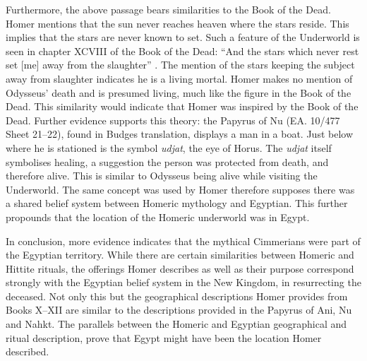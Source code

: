 	Furthermore, the above passage bears similarities to the Book of the Dead. Homer mentions that the sun never reaches heaven where the stars reside. This implies that the stars are never known to set. Such a feature of the Underworld is seen in chapter XCVIII of the Book of the Dead: “And the stars which never rest set [me] away from the slaughter” \parencite[296]{Budge1969}. The mention of the stars keeping the subject away from slaughter indicates he is a living mortal. Homer makes no mention of Odysseus’ death and is presumed living, much like the figure in the Book of the Dead. This similarity would indicate that Homer was inspired by the Book of the Dead. Further evidence supports this theory: the Papyrus of Nu (EA. 10/477 Sheet 21–22), found in Budges translation, displays a man in a boat. Just below where he is stationed is the symbol \emph{udjat}, the eye of Horus. The \emph{udjat} itself symbolises healing, a suggestion the person was protected from death, and therefore alive. This is similar to Odysseus being alive while visiting the Underworld. The same concept was used by Homer therefore supposes there was a shared belief system between Homeric mythology and Egyptian. This further propounds that the location of the Homeric underworld was in Egypt. 
	
	
	
	
	In conclusion, more evidence indicates that the mythical Cimmerians were part of the Egyptian territory. While there are certain similarities between Homeric and Hittite rituals, the offerings Homer describes as well as their purpose correspond strongly with the Egyptian belief system in the New Kingdom, in resurrecting the deceased. Not only this but the geographical descriptions Homer provides from Books X–XII are similar to the descriptions provided in the Papyrus of Ani, Nu and Nahkt. The parallels between the Homeric and Egyptian geographical and ritual description, prove that Egypt might have been the location Homer described. 
	
	
	
